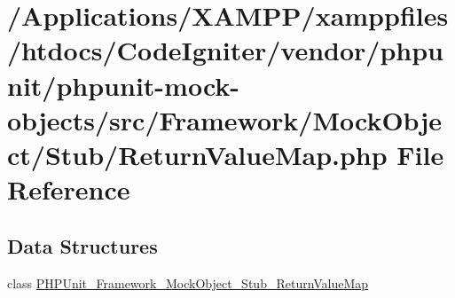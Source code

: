 \hypertarget{_return_value_map_8php}{}\section{/\+Applications/\+X\+A\+M\+P\+P/xamppfiles/htdocs/\+Code\+Igniter/vendor/phpunit/phpunit-\/mock-\/objects/src/\+Framework/\+Mock\+Object/\+Stub/\+Return\+Value\+Map.php File Reference}
\label{_return_value_map_8php}
\subsection*{Data Structures}
\begin{DoxyCompactItemize}
\item 
class \mbox{\hyperlink{class_p_h_p_unit___framework___mock_object___stub___return_value_map}{P\+H\+P\+Unit\+\_\+\+Framework\+\_\+\+Mock\+Object\+\_\+\+Stub\+\_\+\+Return\+Value\+Map}}
\end{DoxyCompactItemize}
